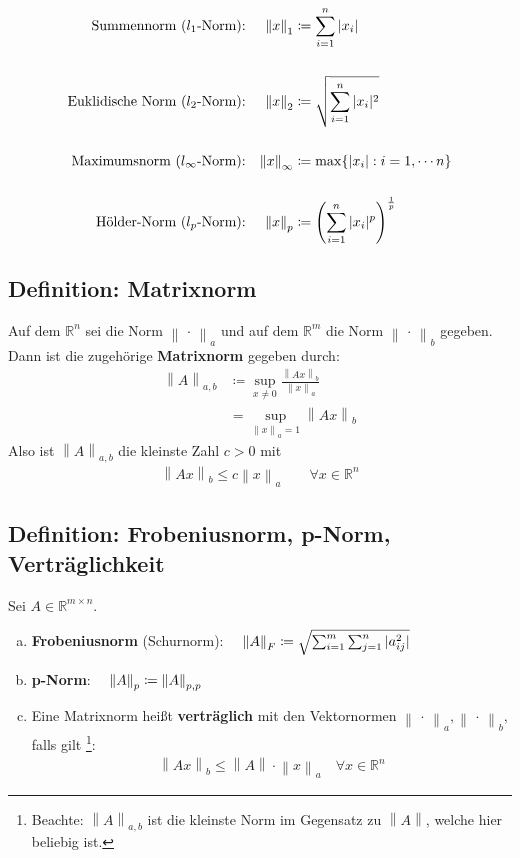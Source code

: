 \documentclass[ngerman,fontsize=11pt, paper=a4, parskip=half, titlepage=true, toc=bib]{scrbook}
\newcommand{\R}{\mathds{R}}
\newcommand{\nn}[1]{\left\| #1 \right\|}
\begin{document}
\begin{align*}
	\text{Summennorm ($l_1$-Norm):} &&	\nn{x}_1 &\coloneqq \sum_{i=1}^{n}|x_i| 
	\index{Norm!Summennorm}\\
			 \\
	\text{Euklidische Norm ($l_2$-Norm):} &&	\nn{x}_2 &\coloneqq \sqrt{\sum_{i=1}^{n}|x_i|^2}
	\index{Norm!Euklidische Norm} \\
		  	 \\
	\text{Maximumsnorm ($l_\infty$-Norm):} &&\nn{x}_\infty &\coloneqq \max\{|x_i| : i=1, \cdots n\} \\
		\index{Norm!Maximumsnorm}
			 \\
	\text{Hölder-Norm ($l_p$-Norm):} &&	\nn{x}_p &\coloneqq 
		\left(\sum_{i=1}^{n}|x_i|^p\right)^{\frac{1}{p}} 
		\index{Norm!Hölder-Norm}
\end{align*}



\subsection{Definition: Matrixnorm} \label{3.2.4}
Auf dem $\R^n$  sei die Norm $\nn{\,\cdot\,}_a$ und auf dem $\R^m$ die Norm $\nn{\,\cdot\,}_b$ gegeben.
Dann ist die zugehörige \textbf{Matrixnorm}  gegeben durch:
\begin{align}
	\nn{A}_{a,b} &\coloneqq \sup_{x\neq 0} \frac{\nn{Ax}_b}{\nn{x}_a} \\ \nonumber
					 &= \sup_{\nn{x}_a=1} \nn{Ax}_b \label{III.2.1} 
\end{align}
Also ist   $\nn{A}_{a,b}$ die kleinste Zahl $c>0$ mit
\begin{gather*}
	\nn{Ax}_b  \leq c\nn{x}_a \quad\quad \forall x\in \R^n
\end{gather*}

\subsection{Definition: Frobeniusnorm, p-Norm, Verträglichkeit} \label{3.2.5}
Sei $A\in \R^{m\times n}$.
\begin{enumerate}[a)]
	\item \textbf{Frobeniusnorm} (Schurnorm):
			 $ \quad \nn{A}_F \coloneqq \sqrt{\sum_{i=1}^{m}\sum_{j=1}^{n}|a_{ij}^2|}
				 \index{Norm!Frobeniusnorm}$
    \item \textbf{p-Norm}: 
			 $\quad \nn{A}_p \coloneqq \nn{A}_{p,p}
				 \index{p-Norm}$
    \item Eine Matrixnorm heißt \textbf{verträglich}  mit den Vektornormen 
			    $\nn{\,\cdot\,}_a, \nn{\,\cdot\,}_b$, falls gilt
			    \footnote{ Beachte: $\nn{A}_{a,b}$ ist die kleinste Norm im Gegensatz zu $\nn{A}$, welche hier beliebig ist.}:
				 \begin{gather*}
					 	\nn{Ax}_b \leq \nn{A}\cdot \nn{x}_a \quad \forall x\in \R^n
				 \end{gather*}
\end{enumerate}
\end{document}
